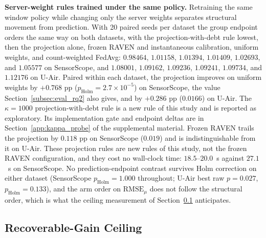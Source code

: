 \documentclass[letterpaper,journal]{IEEEtran}
\begin{document}
\noindent\textbf{Server-weight rules trained under the same policy.}
Retraining the same window policy while changing only the server weights
separates structural movement from prediction.  With 20 paired seeds per dataset
the group endpoint orders the same way on both datasets, with the
projection-with-debt rule lowest, then the projection alone, frozen RAVEN and
instantaneous calibration, uniform weights, and count-weighted FedAvg: $0.98464$,
$1.01158$, $1.01394$, $1.01409$, $1.02693$, and $1.05577$ on SensorScope, and
$1.08001$, $1.09162$, $1.09236$, $1.09241$, $1.09734$, and $1.12176$ on U-Air.
Paired within each dataset, the projection improves on uniform weights by
$+0.768$ pp ($p_{\mathrm{Holm}}=2.7\times10^{-5}$) on SensorScope, the value
Section~\ref{subsec:eval_rq2} also gives, and by $+0.286$ pp ($0.0166$) on U-Air.
The $\kappa=1000$ projection-with-debt rule is a new rule of this study and is
reported as exploratory.  Its implementation gate and endpoint deltas are in
Section~\ref{app:kappa_probe} of the supplemental material.
Frozen RAVEN trails the projection by $0.118$ pp on SensorScope ($0.019$) and is
indistinguishable from it on U-Air.  These projection rules are new rules of
this study, not the frozen RAVEN configuration, and they cost no wall-clock time:
$18.5$--$20.0$~s against $27.1$~s on SensorScope.  No prediction-endpoint
contrast survives Holm correction on either dataset (SensorScope
$p_{\mathrm{Holm}}=1.000$ throughout; U-Air best raw $p=0.027$,
$p_{\mathrm{Holm}}=0.133$), and the arm order on $\mathrm{RMSE}_{\mu}$ does not
follow the structural order, which is what the ceiling measurement of
Section~\ref{subsec:ceiling} anticipates.

\subsection{Recoverable-Gain Ceiling}
\label{subsec:ceiling}
\end{document}
